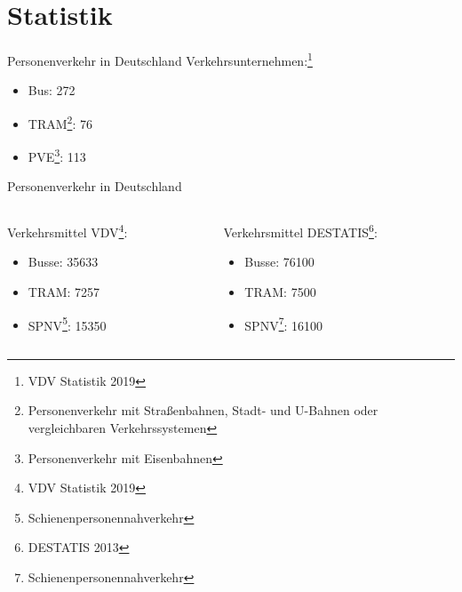 
\section{Statistik}

\begin{frame}{Personenverkehr in Deutschland}
  Verkehrsunternehmen:\footnote{VDV Statistik 2019}
  \begin{itemize}
    \item Bus: 272
    \item TRAM\footnote{Personenverkehr mit Straßenbahnen, Stadt- und U-Bahnen oder vergleichbaren Verkehrssystemen}: 76
    \item PVE\footnote{Personenverkehr mit Eisenbahnen}: 113
  \end{itemize}
\end{frame}

\begin{frame}{Personenverkehr in Deutschland}
  \begin{columns}

    \begin{column}{0.5\textwidth}
      \minipage[c][0.65\textheight][s]{\columnwidth}
      Verkehrsmittel VDV\footnote{VDV Statistik 2019}:
      \begin{itemize}
      \item Busse: 35633
      \item TRAM: 7257
      \item SPNV\footnote{Schienenpersonennahverkehr}: 15350
      \end{itemize}
      \endminipage
    
    \end{column}

    \begin{column}{0.5\textwidth}
      \minipage[c][0.65\textheight][s]{\columnwidth}
    Verkehrsmittel DESTATIS\footnote{DESTATIS 2013}:
    \begin{itemize}
    \item Busse: 76100
    \item TRAM: 7500
    \item SPNV\footnote{Schienenpersonennahverkehr}: 16100
    \end{itemize}
    \endminipage
    \end{column}

  \end{columns}
\end{frame}


